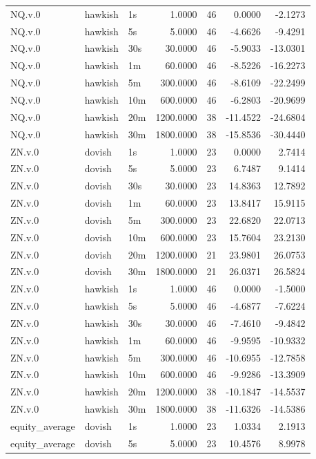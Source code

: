 \begin{tabular}{lllrrrr}
NQ.v.0 & hawkish & 1s & 1.0000 & 46 & 0.0000 & -2.1273 \\
NQ.v.0 & hawkish & 5s & 5.0000 & 46 & -4.6626 & -9.4291 \\
NQ.v.0 & hawkish & 30s & 30.0000 & 46 & -5.9033 & -13.0301 \\
NQ.v.0 & hawkish & 1m & 60.0000 & 46 & -8.5226 & -16.2273 \\
NQ.v.0 & hawkish & 5m & 300.0000 & 46 & -8.6109 & -22.2499 \\
NQ.v.0 & hawkish & 10m & 600.0000 & 46 & -6.2803 & -20.9699 \\
NQ.v.0 & hawkish & 20m & 1200.0000 & 38 & -11.4522 & -24.6804 \\
NQ.v.0 & hawkish & 30m & 1800.0000 & 38 & -15.8536 & -30.4440 \\
ZN.v.0 & dovish & 1s & 1.0000 & 23 & 0.0000 & 2.7414 \\
ZN.v.0 & dovish & 5s & 5.0000 & 23 & 6.7487 & 9.1414 \\
ZN.v.0 & dovish & 30s & 30.0000 & 23 & 14.8363 & 12.7892 \\
ZN.v.0 & dovish & 1m & 60.0000 & 23 & 13.8417 & 15.9115 \\
ZN.v.0 & dovish & 5m & 300.0000 & 23 & 22.6820 & 22.0713 \\
ZN.v.0 & dovish & 10m & 600.0000 & 23 & 15.7604 & 23.2130 \\
ZN.v.0 & dovish & 20m & 1200.0000 & 21 & 23.9801 & 26.0753 \\
ZN.v.0 & dovish & 30m & 1800.0000 & 21 & 26.0371 & 26.5824 \\
ZN.v.0 & hawkish & 1s & 1.0000 & 46 & 0.0000 & -1.5000 \\
ZN.v.0 & hawkish & 5s & 5.0000 & 46 & -4.6877 & -7.6224 \\
ZN.v.0 & hawkish & 30s & 30.0000 & 46 & -7.4610 & -9.4842 \\
ZN.v.0 & hawkish & 1m & 60.0000 & 46 & -9.9595 & -10.9332 \\
ZN.v.0 & hawkish & 5m & 300.0000 & 46 & -10.6955 & -12.7858 \\
ZN.v.0 & hawkish & 10m & 600.0000 & 46 & -9.9286 & -13.3909 \\
ZN.v.0 & hawkish & 20m & 1200.0000 & 38 & -10.1847 & -14.5537 \\
ZN.v.0 & hawkish & 30m & 1800.0000 & 38 & -11.6326 & -14.5386 \\
equity_average & dovish & 1s & 1.0000 & 23 & 1.0334 & 2.1913 \\
equity_average & dovish & 5s & 5.0000 & 23 & 10.4576 & 8.9978 \\

\end{tabular}
